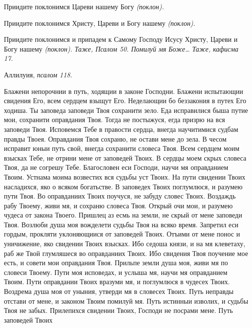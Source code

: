    Приидите поклонимся Цареви нашему Богу \itshape (поклон)\normalfont{}.


   Приидите поклонимся Христу, Цареви и Богу нашему \itshape (поклон)\normalfont{}.


   Приидите поклонимся и припадем к Самому Господу Исусу Христу,
Цареви и Богу нашему \itshape (поклон)\normalfont{}. \itshape Таже, Псалом 50\normalfont{}. Помилуй мя Боже…
\itshape Таже, кафисма 17\normalfont{}.


   Аллилуия, \itshape псалом 118\normalfont{}.


   Блажени непорочнии в путь, ходящии в законе Господни. Блажени
испытающии свидения Его, всем сердцем взыщут Его. Неделающии бо
беззакония в путех Его ходиша. Ты заповеда заповеди Твоя сохранити зело.
Еда исправилися быша путие мои, сохранити оправдания Твоя. Тогда не
постыжуся, егда призрю на вся заповеди Твоя. Исповемся Тебе в правости
сердца, внегда научитимися судбам правды Твоея. Оправдания Твоя
сохраню, не остави мене до зела. В чесом исправит юныи путь свой, внегда
сохранити словеса Твоя. Всем сердцем моим взысках Тебе, не отрини мене от
заповедей Твоих. В сердцы моем скрых словеса Твоя, да не согрешу Тебе.
Благословен еси Господи, научи мя оправданием Твоим. Устнама моима
возвестих вся судьбы уст Твоих. На пути свидении Твоих насладихся, яко о
всяком богатьстве. В заповедех Твоих поглумлюся, и разумею пути Твоя.
Во оправданиих Твоих поучуся, не забуду словес Твоих. Воздаждь
рабу Твоему, живи мя, и сохраню словеса Твоя. Открый очи мои, и
разумею чудеса от закона Твоего. Пришлец аз есмь на земли, не скрый
от мене заповеди Твоя. Возлюби душа моя вожделети судьбы Твоя
на всяко время. Запретил еси гордым, прокляти уклоняющиися от
заповедей Твоих. Отъими от мене понос и уничижение, яко свидении
Твоих взысках. Ибо седоша князи, и на мя клеветаху, раб же Твой
глумляшеся во оправданиих Твоих. Ибо свидения Твоя поучение мое
есть, и совети мои оправдания Твоя. Прильпе земли душа моя, живи
мя по словеси Твоему. Пути моя исповедах, и услыша мя, научи мя
оправданием Твоим. Пути оправдании Твоих вразуми мя, и поглумлюся в
чудесех Твоих. Воздрема душа моя от уныния, утверди мя в словесех
Твоих. Путь неправды отстави от мене, и законом Твоим помилуй
мя. Путь истинныи изволих, и судьбы Твоя не забых. Прилепихся
свидении Твоих, Господи не посрами мене. Путь заповедей Твоих

